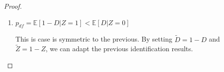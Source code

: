 \documentclass[12pt]{article}
\theoremstyle{plain}
\theoremstyle{definition}
\theoremstyle{remark}
\begin{document}
\begin{proof}
\begin{enumerate}
\begin{eqnarray*}
    \Theta_I^{3,1}(A_2) &=& \Bigg \{\Gamma \in \mathbb R^{20}: \theta_{0a}(p_a)=\theta_{1a}(p_a) = \mu_{1a} - \mu_{0a}, \theta_{0n}(p_n) = \theta_{1n}(p_n) = \mu_{1n} - \mu_{0n}(p_n),\\
   && \qquad \theta_{0c}(p_{c})=\theta_{1c}(p_{c})=\mathbb{E}[Y \vert  D=1, Z=1]-\frac{\mathbb{E}[Y(1-D)  \vert  Z=0]-p_n \mu_{0 n}(p_n)}{\mathbb{E}[1-D  \vert  Z=0]-p_n},\\   
   &&\qquad \theta_{0df}(p_{df})=\theta_{1df}(p_{df}) = \mathbb{E}[Y \vert  D=1, Z=0]- \frac{\mathbb{E}[Y(1-D)  \vert  Z=1]-p_n \mu_{0 n}(p_n)}{\mathbb{E}[1-D  \vert  Z=1]-p_n},\\   
   && \qquad \delta_{0a}=\delta_{1a}=\delta_{0c}=\delta_{1c}=\delta_{0df}=\delta_{1df}=\delta_{0n}=\delta_{1n}=0,\\
   && \qquad p_a=0, p_c=\mathbb{E}[D  \vert  Z=1], p_{df}=\mathbb{E}[D  \vert  Z=0], p_n=\mathbb{E}[1-D  \vert  Z=1]-\mathbb{E}[D  \vert  Z=0],\\
    && \qquad  \mu_{0n}(p_n)\in \left[\mu_{F_{0n}^{UB}}(p_{n}),\mu_{F_{0n}^{LB}}(p_{n})\right], \mu_{1n}, \mu_{0a}, \mu_{1a} \in \left[\inf \mathcal{Y}, \sup \mathcal{Y}\right]
   \Bigg \}, 
\end{eqnarray*}

    \item $p_{df}=\mathbb E[1-D\vert Z=1] < \mathbb E[D\vert Z=0]$

    This is case is symmetric to the previous. By setting $\tilde{D}=1-D$ and $\tilde{Z}=1-Z$, we can adapt the previous identification results.


\end{enumerate}
\end{proof}
\end{document}
